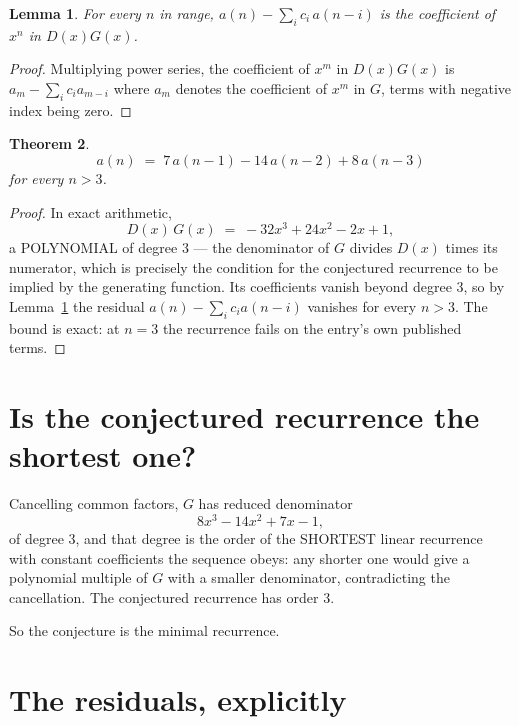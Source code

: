 \documentclass[11pt,a4paper]{article}
\theoremstyle{plain}
\newtheorem{theorem}{Theorem}
\newtheorem{lemma}[theorem]{Lemma}
\theoremstyle{definition}
\begin{document}
\begin{lemma}\label{lem:key}
For every $n$ in range, $a(n)-\sum_i c_i\,a(n-i)$ is the coefficient of $x^{n}$ in
$D(x)G(x)$.
\end{lemma}

\begin{proof}
Multiplying power series, the coefficient of $x^{m}$ in $D(x)G(x)$ is
$a_m-\sum_i c_i a_{m-i}$ where $a_m$ denotes the coefficient of $x^{m}$ in $G$, terms with
negative index being zero.
\end{proof}

\begin{theorem}
\[
a(n)\;=\;7\,a(n-1) - 14\,a(n-2) + 8\,a(n-3)
\]
for every $n>3$.
\end{theorem}

\begin{proof}
In exact arithmetic,
\[
D(x)\,G(x)\;=\;- 32 x^{3} + 24 x^{2} - 2 x + 1,
\]
a POLYNOMIAL of degree $3$ --- the denominator of $G$ divides $D(x)$ times its numerator,
which is precisely the condition for the conjectured recurrence to be implied by the
generating function. Its coefficients vanish beyond degree $3$, so by
Lemma~\ref{lem:key} the residual $a(n)-\sum_ic_ia(n-i)$ vanishes for every
$n>3$. The bound is exact: at $n=3$ the recurrence fails on the entry's own published terms.
\end{proof}

\section{Is the conjectured recurrence the shortest one?}

Cancelling common factors, $G$ has reduced denominator
\[
8 x^{3} - 14 x^{2} + 7 x - 1,
\]
of degree $3$, and that degree is the order of the SHORTEST linear recurrence with
constant coefficients the sequence obeys: any shorter one would give a polynomial multiple of
$G$ with a smaller denominator, contradicting the cancellation. The conjectured recurrence has
order $3$.

So the conjecture is the minimal recurrence.

\section{The residuals, explicitly}
\end{document}
